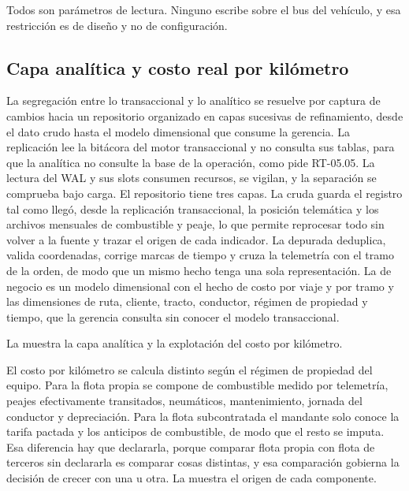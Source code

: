 Todos son parámetros de lectura. Ninguno escribe sobre el bus del vehículo, y esa restricción es de
diseño y no de configuración.

\subsection{Capa analítica y costo real por kilómetro}\label{sec:4-analitica}

La segregación entre lo transaccional y lo analítico se resuelve por captura de cambios hacia un
repositorio organizado en capas sucesivas de refinamiento, desde el dato crudo hasta el modelo
dimensional que consume la gerencia. La replicación lee la bitácora del motor transaccional y no
consulta sus tablas, para que la analítica no consulte la base de la operación, como pide RT-05.05. La
lectura del WAL y sus slots consumen recursos, se vigilan, y la separación se comprueba bajo carga. El
repositorio tiene tres capas. La cruda guarda el registro tal como llegó, desde la replicación
transaccional, la posición telemática y los archivos mensuales de combustible y peaje, lo que permite
reprocesar todo sin volver a la fuente y trazar el origen de cada indicador. La depurada deduplica,
valida coordenadas, corrige marcas de tiempo y cruza la telemetría con el tramo de la orden, de modo que
un mismo hecho tenga una sola representación. La de negocio es un modelo dimensional con el hecho de
costo por viaje y por tramo y las dimensiones de ruta, cliente, tracto, conductor, régimen de propiedad
y tiempo, que la gerencia consulta sin conocer el modelo transaccional.

La  muestra la capa analítica y la explotación del costo por kilómetro.


El costo por kilómetro se calcula distinto según el régimen de propiedad del equipo. Para la flota
propia se compone de combustible medido por telemetría, peajes efectivamente transitados, neumáticos,
mantenimiento, jornada del conductor y depreciación. Para la flota subcontratada el mandante solo
conoce la tarifa pactada y los anticipos de combustible, de modo que el resto se imputa. Esa diferencia
hay que declararla, porque comparar flota propia con flota de terceros sin declararla es comparar cosas
distintas, y esa comparación gobierna la decisión de crecer con una u otra. La 
muestra el origen de cada componente.

